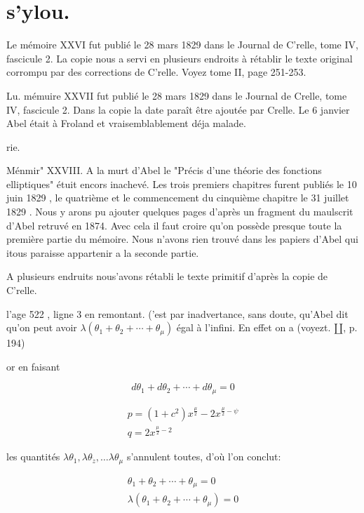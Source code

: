 \documentclass{article}
\begin{document}
\section*{s'ylou.}

Le mémoire XXVI fut publié le 28 mars 1829 dans le Journal de C'relle, tome IV, fascicule 2. La copie nous a servi en plusieurs endroits à rétablir le texte original corrompu par des corrections de C'relle. Voyez tome II, page 251-253.

Lu. mémuire XXVII fut publié le 28 mars 1829 dans le Journal de Crelle, tome IV, fascicule 2. Dans la copie la date paraît être ajoutée par Crelle. Le 6 janvier Abel était à Froland et vraisemblablement déja malade.

rie.

Ménmir" XXVIII. A la murt d'Abel le "Précis d'une théorie des fonctions elliptiques" étuit encors inachevé. Les trois premiers chapitres furent publiés le 10 juin 1829 , le quatrième et le commencement du cinquième chapitre le 31 juillet 1829 . Nous y arons pu ajouter quelques pages d'après un fragment du maulscrit d'Abel retruvé en 1874. Avec cela il faut croire qu'on possède presque toute la première partie du mémoire. Nous n'avons rien trouvé dans les papiers d'Abel qui itous paraisse appartenir a la seconde partie.

A plusieurs endruits nous'avons rétabli le texte primitif d'après la copie de C'relle.

l'age 522 , ligne 3 en remontant. ('est par inadvertance, sans doute, qu'Abel dit qu'on peut avoir \(\lambda\left(\theta_{1}+\theta_{2}+\cdots+\theta_{\mu}\right)\) égal à l'infini. En effet on a (voyezt. \(\amalg\), p. 194)

or en faisant

\[
d \theta_{1}+d \theta_{2}+\cdots+d \theta_{\mu}=0
\]

\[
\begin{gathered}
p=\left(1+c^{2}\right) x^{\frac{\mu}{2}}-2 x^{\frac{\mu}{2}-\psi} \\
q=2 x^{\frac{\mu}{2}-2}
\end{gathered}
\]

les quantités \(\lambda \theta_{1}, \lambda \theta_{\ddot{z}}, \ldots \lambda \theta_{\mu}\) s'annulent toutes, d'où l'on conclut:

\[
\begin{gathered}
\theta_{1}+\theta_{2}+\cdots+\theta_{\mu}=0 \\
\lambda\left(\theta_{1}+\theta_{2}+\cdots+\theta_{\mu}\right)=0
\end{gathered}
\]
\end{document}
